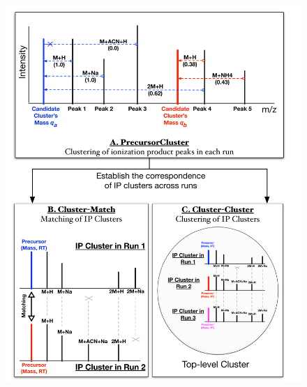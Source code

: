 \begin{figure}[!htbp]
\centering
\includegraphics[width=1.0\linewidth]{05-precursor-cluster/figures/fig1.pdf}

\end{figure}
